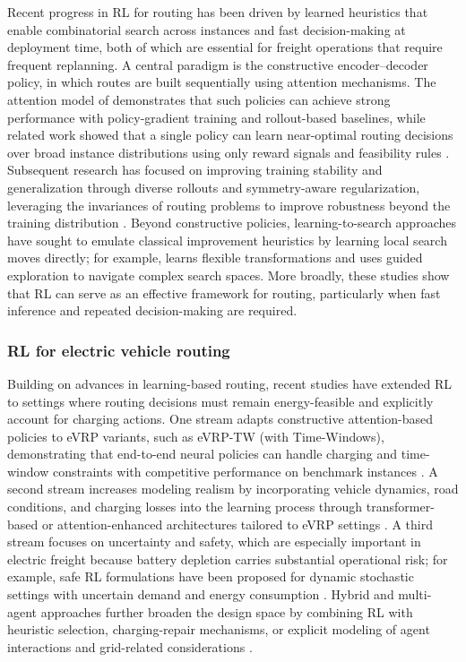 \documentclass[journal]{IEEEtran}
\begin{document}
Recent progress in RL for routing has been driven by learned heuristics that enable combinatorial search across instances and fast decision-making at deployment time, both of which are essential for freight operations that require frequent replanning. A central paradigm is the constructive encoder--decoder policy, in which routes are built sequentially using attention mechanisms. The attention model of \cite{kool2018attention} demonstrates that such policies can achieve strong performance with policy-gradient training and rollout-based baselines, while related work showed that a single policy can learn near-optimal routing decisions over broad instance distributions using only reward signals and feasibility rules \citep{NEURIPS2018_9fb4651c}. Subsequent research has focused on improving training stability and generalization through diverse rollouts and symmetry-aware regularization, leveraging the invariances of routing problems to improve robustness beyond the training distribution \citep{Sym-NCO}. Beyond constructive policies, learning-to-search approaches have sought to emulate classical improvement heuristics by learning local search moves directly; for example, \cite{NEURIPS2023_9bae70d3} learns flexible transformations and uses guided exploration to navigate complex search spaces. More broadly, these studies show that RL can serve as an effective framework for routing, particularly when fast inference and repeated decision-making are required.


\subsubsection{RL for electric vehicle routing}

Building on advances in learning-based routing, recent studies have extended RL to settings where routing decisions must remain energy-feasible and explicitly account for charging actions. One stream adapts constructive attention-based policies to eVRP variants, such as eVRP-TW (with Time-Windows), demonstrating that end-to-end neural policies can handle charging and time-window constraints with competitive performance on benchmark instances \citep{lin2025,10608117}. A second stream increases modeling realism by incorporating vehicle dynamics, road conditions, and charging losses into the learning process through transformer-based or attention-enhanced architectures tailored to eVRP settings \citep{TANG2023121711,11016767}. A third stream focuses on uncertainty and safety, which are especially important in electric freight because battery depletion carries substantial operational risk; for example, safe RL formulations have been proposed for dynamic stochastic settings with uncertain demand and energy consumption \citep{BASSO2022102496}. Hybrid and multi-agent approaches further broaden the design space by combining RL with heuristic selection, charging-repair mechanisms, or explicit modeling of agent interactions and grid-related considerations \citep{lin2022,10310266,ALQAHTANI2022122626}. 
\end{document}
